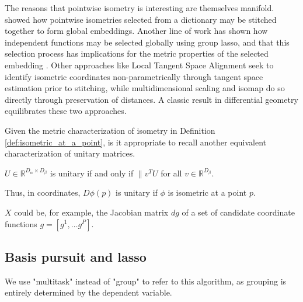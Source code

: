 The reasons that pointwise isometry is interesting are themselves manifold.
\cite{Kohli2021-lr} showed how pointwise isometries selected from a dictionary may be stitched together to form global embeddings.
Another line of work \cite{Koelle2022-ju, Koelle2024-no} has shown how independent functions may be selected globally using group lasso, and that this selection process has implications for the metric properties of the selected embedding \cite{Koelle2022-ju}.
Other approaches like Local Tangent Space Alignment seek to identify isometric coordinates non-parametrically through tangent space estimation prior to stitching, while multidimensional scaling and isomap do so directly through preservation of distances.
A classic result in differential geometry equilibrates these two approaches.

Given the metric characterization of isometry in Definition \ref{def:isometric_at_a_point}, is it appropriate to recall another equivalent characterization of unitary matrices.
\begin{proposition}
\label{prop:unitary_spectrum}
$U \in \mathbb{R}^{D_\alpha \times D_\beta}$ is unitary if and only if $\| v^T  U$ for all $v \in \mathbb R^{D_\beta}$.
\end{proposition}
Thus, in coordinates, $D \phi (p)$ is unitary if $\phi$ is isometric at a point $p$.

$X$ could be, for example, the Jacobian matrix $d g$ of a set of candidate coordinate functions $g = [g^1, \dotsc g^P]$.


\subsection{Basis pursuit and lasso}


We use "multitask" instead of "group" to refer to this algorithm, as grouping is entirely determined by the dependent variable. 
